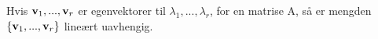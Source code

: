 Hvis $\mathbf{v}_1, ..., \mathbf{v}_r$ er egenvektorer til $\lambda_1, ..., \lambda_r$,
for en matrise A,
så er mengden $\{ \mathbf{v}_1, ..., \mathbf{v}_r \}$ lineært uavhengig.
